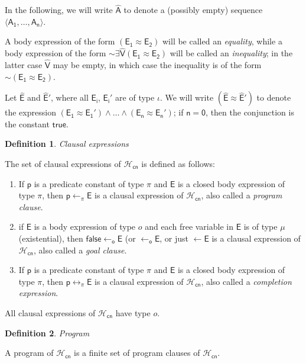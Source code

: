 \documentclass[inscr,ack,preface]{dithesis}
\theoremstyle{definition}
\newtheorem{definition}{Definition}[]
\newcommand{\hcn}{$\mathcal{H}_\mathsf{cn}$}
\newcommand{\msf}[1]{$\mathsf{#1}$}
\begin{document}
In the following, we will write \msf{\widehat{A}} to denote a (possibly empty) sequence \msf{\langle A_1, \ldots, A_n \rangle}.

A body expression of the form \msf{\left( E_1 \approx E_2 \right)} will be called an \emph{equality}, while a body expression of the form \msf{\sim \exists \widehat{V} \left( E_1 \approx E_2 \right)} will be called an \emph{inequality}; in the latter case \msf{\widehat{V}} may be empty, in which case the inequality is of the form \msf{\sim \left( E_1 \approx E_2 \right)}.

Let \msf{\widehat{E}} and \msf{\widehat{E}'}, where all \msf{E_i}, \msf{E_i'} are of type $\iota$. We will write \msf{\left( \widehat{E} \approx \widehat{E}' \right)} to denote the expression \msf{\left( E_1 \approx E_1' \right) \land \dots \land \left( E_n \approx E_n' \right)}; if \msf{n = 0}, then the conjunction is the constant \msf{true}.

\begin{definition}{\emph{Clausal expressions}}

The set of clausal expressions of \hcn{} is defined as follows:
\begin{enumerate}
  \item If \msf{p} is a predicate constant of type $\pi$ and \msf{E} is a closed body expression of type $\pi$, then \msf{p \leftarrow_{\pi} E} is a clausal expression of \hcn{}, also called a \emph{program clause}.
  \item if \msf{E} is a body expression of type $o$ and each free variable in \msf{E} is of type $\mu$ (existential), then \msf{false \leftarrow_{o} E} (or \msf{\leftarrow_{o} E}, or just \msf{\leftarrow E} is a clausal expression of \hcn{}, also called a \emph{goal clause}.
  \item If \msf{p} is a predicate constant of type $\pi$ and \msf{E} is a closed body expression of type $\pi$, then \msf{p \leftrightarrow_{\pi} E} is a clausal expression of \hcn{}, also called a \emph{completion expression}.
\end{enumerate}

All clausal expressions of \hcn{} have type $o$.
\end{definition}

\begin{definition}{\emph{Program}}

A program of \hcn{} is a finite set of program clauses of \hcn{}.
\end{definition}
\end{document}
